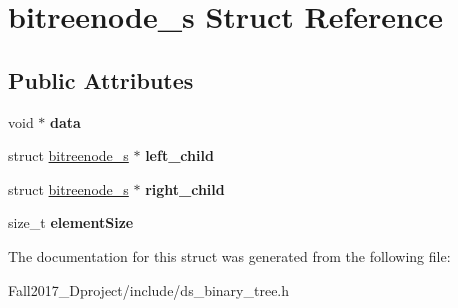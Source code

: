 \hypertarget{structbitreenode__s}{}\section{bitreenode\+\_\+s Struct Reference}
\label{structbitreenode__s}
\subsection*{Public Attributes}
\begin{DoxyCompactItemize}
\item 
\mbox{\label{structbitreenode__s_ad7e8c5222db80c8ca8f3fc1cf5795253}} 
void $\ast$ {\bfseries data}
\item 
\mbox{\label{structbitreenode__s_a4883e527f23b67ba5e579fce7e6d353b}} 
struct \hyperlink{structbitreenode__s}{bitreenode\+\_\+s} $\ast$ {\bfseries left\+\_\+child}
\item 
\mbox{\label{structbitreenode__s_ac0ddfdd9fc23bdd7206fa0072d09a185}} 
struct \hyperlink{structbitreenode__s}{bitreenode\+\_\+s} $\ast$ {\bfseries right\+\_\+child}
\item 
\mbox{\label{structbitreenode__s_af19e155d9a83fdb1fe68f39712116735}} 
size\+\_\+t {\bfseries element\+Size}
\end{DoxyCompactItemize}


The documentation for this struct was generated from the following file\+:\begin{DoxyCompactItemize}
\item 
Fall2017\+\_\+Dproject/include/ds\+\_\+binary\+\_\+tree.\+h\end{DoxyCompactItemize}
